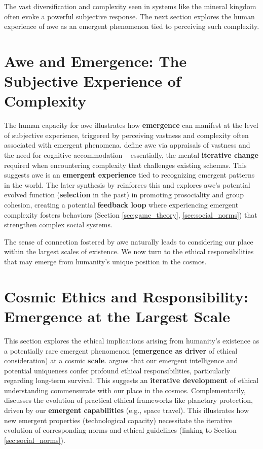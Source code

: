 The vast diversification and complexity seen in systems like the mineral kingdom often evoke a powerful subjective response. The next section explores the human experience of awe as an emergent phenomenon tied to perceiving such complexity.

\section{Awe and Emergence: The Subjective Experience of Complexity} \label{sec:awe}
The human capacity for awe illustrates how \textbf{emergence} can manifest at the level of subjective experience, triggered by perceiving vastness and complexity often associated with emergent phenomena. \citet{keltner2003approaching} define awe via appraisals of vastness and the need for cognitive accommodation – essentially, the mental \textbf{iterative change} required when encountering complexity that challenges existing schemas. This suggests awe is an \textbf{emergent experience} tied to recognizing emergent patterns in the world. The later synthesis by \citet{keltner2023science} reinforces this and explores awe's potential evolved function (\textbf{selection} in the past) in promoting prosociality and group cohesion, creating a potential \textbf{feedback loop} where experiencing emergent complexity fosters behaviors (Section \ref{sec:game_theory}, \ref{sec:social_norms}) that strengthen complex social systems.

The sense of connection fostered by awe naturally leads to considering our place within the largest scales of existence. We now turn to the ethical responsibilities that may emerge from humanity's unique position in the cosmos.

\section{Cosmic Ethics and Responsibility: Emergence at the Largest Scale} \label{sec:cosmic_ethics}
This section explores the ethical implications arising from humanity's existence as a potentially rare emergent phenomenon (\textbf{emergence as driver} of ethical consideration) at a cosmic \textbf{scale}. \citet{losapio2022cosmic} argues that our emergent intelligence and potential uniqueness confer profound ethical responsibilities, particularly regarding long-term survival. This suggests an \textbf{iterative development} of ethical understanding commensurate with our place in the cosmos. Complementarily, \citet{cockell2005planetary} discusses the evolution of practical ethical frameworks like planetary protection, driven by our \textbf{emergent capabilities} (e.g., space travel). This illustrates how new emergent properties (technological capacity) necessitate the iterative evolution of corresponding norms and ethical guidelines (linking to Section \ref{sec:social_norms}).

